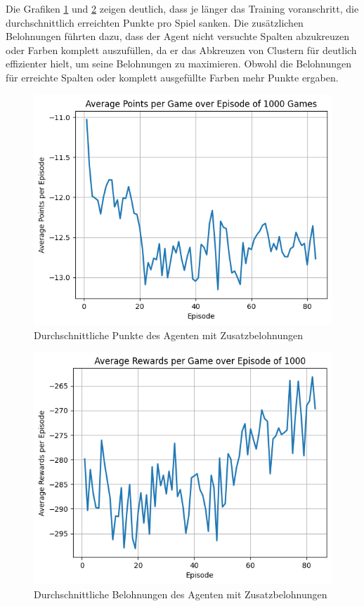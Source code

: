 Die  Grafiken \ref{fig:average_points} und \ref{fig:average_rewards} zeigen deutlich, dass je länger das Training voranschritt, die durchschnittlich erreichten Punkte pro Spiel sanken.
Die zusätzlichen Belohnungen führten dazu, dass der Agent nicht versuchte Spalten abzukreuzen oder Farben komplett auszufüllen, da er das Abkreuzen von Clustern für deutlich effizienter hielt, um seine Belohnungen zu maximieren.
Obwohl die Belohnungen für erreichte Spalten oder komplett ausgefüllte Farben mehr Punkte ergaben. 

\begin{figure}[!h]
    \centering
    \includegraphics[scale=0.6]{Bilder/average_points.png}
    \caption{Durchschnittliche Punkte des Agenten mit Zusatzbelohnungen}
    \label{fig:average_points}
\end{figure}

\begin{figure}[!h]
    \centering
    \includegraphics[scale=0.6]{Bilder/average_rewards.png}
    \caption{Durchschnittliche Belohnungen des Agenten mit Zusatzbelohnungen }
    \label{fig:average_rewards}
\end{figure}

